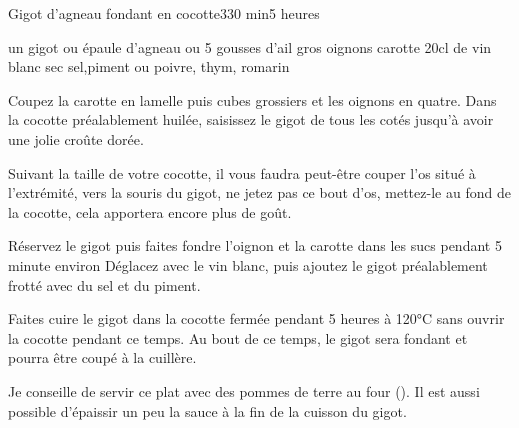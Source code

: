 \begin{recette}{Gigot d'agneau fondant en cocotte}{3}{30 min}{5 heures}
\begin{ingredients}
\ingredient un gigot ou épaule d'agneau
 ou 5 gousses d'ail
 gros oignons
 carotte
\ingredient 20cl de vin blanc sec
\ingredient sel,piment ou poivre, thym, romarin
\end{ingredients}


\begin{preparation}
\etape Coupez la carotte en lamelle puis cubes grossiers et les oignons en quatre.
\etape Dans la cocotte préalablement huilée, saisissez le gigot de tous les cotés jusqu'à avoir une jolie croûte dorée.
\begin{remarque}
Suivant la taille de votre cocotte, il vous faudra peut-être couper l'os situé à l'extrémité, vers la souris du gigot, ne jetez pas ce bout d'os, mettez-le au fond de la cocotte, cela apportera encore plus de goût.
\end{remarque}
\etape Réservez le gigot puis faites fondre l'oignon et la carotte dans les sucs pendant 5 minute environ
\etape Déglacez avec le vin blanc, puis ajoutez le gigot préalablement frotté avec du sel et du piment. 
\end{preparation}

\begin{cuisson}
Faites cuire le gigot dans la cocotte fermée pendant 5 heures à 120°C sans ouvrir la cocotte pendant ce temps. Au bout de ce temps, le gigot sera fondant et pourra être coupé à la cuillère.

Je conseille de servir ce plat avec des pommes de terre au four (). Il est aussi possible d'épaissir un peu la sauce à la fin de la cuisson du gigot. 
\end{cuisson}

\end{recette}

